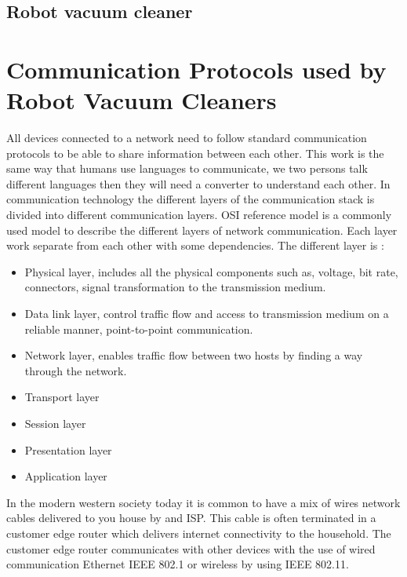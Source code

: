 \subsection{Robot vacuum cleaner}

\section{Communication Protocols used by Robot Vacuum Cleaners}

All devices connected to a network need to follow standard communication protocols to be able to share information between each other. This work is the same way that humans use languages to communicate, we two persons talk different languages then they will need a converter to understand each other. In communication technology the different layers of the communication stack is divided into different communication layers. OSI reference model \cite{osimodel} is a commonly used model to describe the different layers of network communication. Each layer work separate from each other with some dependencies. The different layer is \cite{osimodel}: 
\begin{itemize}
    \item Physical layer, includes all the physical components such as, voltage, bit rate, connectors, signal transformation to the transmission medium. 
    \item Data link layer, control traffic flow and access to transmission medium on a reliable manner, point-to-point communication. 
    \item Network layer, enables traffic flow between two hosts by finding a way through the network. 
    \item Transport layer 
    \item Session layer 
    \item Presentation layer 
    \item Application layer
\end{itemize}
In the modern western society today it is common to have a mix of wires network cables delivered to you house by and ISP. This cable is often terminated in a customer edge router which delivers internet connectivity to the household. The customer edge router communicates with other devices with the use of wired communication Ethernet IEEE 802.1 or wireless by using IEEE 802.11. 


